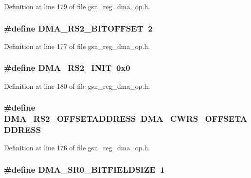 Definition at line 179 of file gsn\_\-reg\_\-dma\_\-op.h.

\hypertarget{a00547_a654dd517ba48234f2afe03fefd92c815}{
\subsubsection[{DMA\_\-RS2\_\-BITOFFSET}]{\setlength{\rightskip}{0pt plus 5cm}\#define DMA\_\-RS2\_\-BITOFFSET~2}}
\label{a00547_a654dd517ba48234f2afe03fefd92c815}


Definition at line 177 of file gsn\_\-reg\_\-dma\_\-op.h.

\hypertarget{a00547_acf403dbc6f7c038de5dbe612f2e4cff5}{
\subsubsection[{DMA\_\-RS2\_\-INIT}]{\setlength{\rightskip}{0pt plus 5cm}\#define DMA\_\-RS2\_\-INIT~0x0}}
\label{a00547_acf403dbc6f7c038de5dbe612f2e4cff5}


Definition at line 180 of file gsn\_\-reg\_\-dma\_\-op.h.

\hypertarget{a00547_a71acfd5f9cdb623b78969dbf75a70fed}{
\subsubsection[{DMA\_\-RS2\_\-OFFSETADDRESS}]{\setlength{\rightskip}{0pt plus 5cm}\#define DMA\_\-RS2\_\-OFFSETADDRESS~DMA\_\-CWRS\_\-OFFSETADDRESS}}
\label{a00547_a71acfd5f9cdb623b78969dbf75a70fed}


Definition at line 176 of file gsn\_\-reg\_\-dma\_\-op.h.

\hypertarget{a00547_a2aca63d82ec9757351340b7e0e9a2f46}{
\subsubsection[{DMA\_\-SR0\_\-BITFIELDSIZE}]{\setlength{\rightskip}{0pt plus 5cm}\#define DMA\_\-SR0\_\-BITFIELDSIZE~1}}
\label{a00547_a2aca63d82ec9757351340b7e0e9a2f46}


